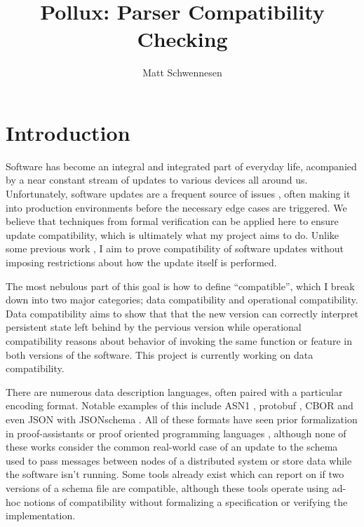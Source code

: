 \documentclass[11pt]{article}
\author{Matt Schwennesen}
\title{Pollux: Parser Compatibility Checking}
\date{}
\theoremstyle{definition}
\theoremstyle{plain}
\begin{document}
\maketitle
\tableofcontents

\section{Introduction}

Software has become an integral and integrated part of everyday life, acompanied
by a near constant stream of updates to various devices all around
us. Unfortunately, software updates are a frequent source of issues
\autocites{zhangUnderstandingDetectingSoftware2021}[][]{Gray1986WhyDC}, often
making it into production environments before the necessary edge cases are
triggered. We believe that techniques from formal verification can be applied
here to ensure update compatibility, which is ultimately what my project aims to
do. Unlike some previous work
\autocites{ajmaniModularSoftwareUpgrades2006}[][]{reitblattAbstractionsNetworkUpdate2012},
I aim to prove compatibility of software updates without imposing restrictions
about how the update itself is performed.

The most nebulous part of this goal is how to define ``compatible'', which I
break down into two major categories; data compatibility and operational
compatibility. Data compatibility aims to show that that the new version can
correctly interpret persistent state left behind by the pervious version while
operational compatibility reasons about behavior of invoking the same function
or feature in both versions of the software. This project is currently working
on data compatibility.

There are numerous data description languages, often paired with a particular
encoding format. Notable examples of this include ASN1
\cite{ASN1EncodingRules2021}, protobuf \cite{LanguageGuideProto}, CBOR
\cite{birkholzConciseDataDefinition2019,bormannConciseBinaryObject2020} and even
JSON with JSONschema
\cite{wrightJSONSchemaMedia2022,brayJavaScriptObjectNotation2017}. All of these
formats have seen prior formalization in proof-assistants or proof oriented
programming languages
\cite{habibFindingDataCompatibility2021,ramananandroSecureParsingSerializing2025,yeVerifiedProtocolBuffer2019,niASN1ProvablyCorrect2023},
although none of these works consider the common real-world case of an update to
the schema used to pass messages between nodes of a distributed system or store
data while the software isn't running. Some tools already exist which can report
on if two versions of a schema file are compatible, although these tools operate
using ad-hoc notions of compatibility without formalizing a specification or
verifying the implementation.
\end{document}
